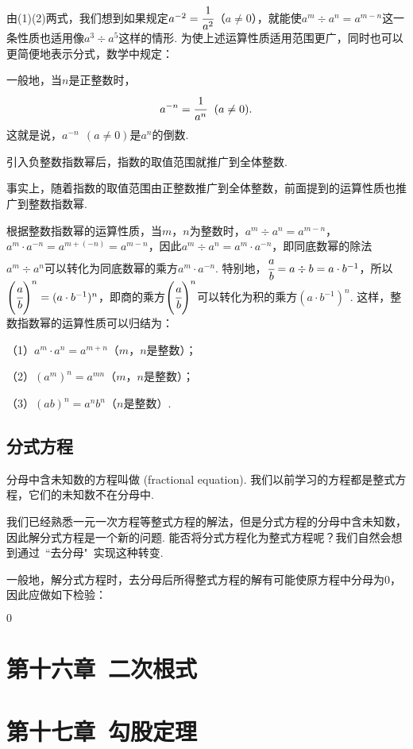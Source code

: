 \documentclass[UTF8,fontset=macnew]{book} %
\begin{document}
				由(1)(2)两式，我们想到如果规定$a^{-2}=\cfrac{1}{a^2} $（$a\ne 0$），就能使$a^m\div a^n=a^{m-n}$这一条性质也适用像$a^3\div a^5$这样的情形. 为使上述运算性质适用范围更广，同时也可以更简便地表示分式，数学中规定：
				
				一般地，当$n$是正整数时，
			$$a^{-n}=\cfrac{1}{a^n} \ \ (a\ne 0).$$
			这就是说，$a^{-n}\ \ (a\ne 0)$是$a^n$的倒数.
				
				引入负整数指数幂后，指数的取值范围就推广到全体整数.
				
				事实上，随着指数的取值范围由正整数推广到全体整数，前面提到的运算性质也推广到整数指数幂.
				
				根据整数指数幂的运算性质，当$m$，$n$为整数时，$a^m\div a^n=a^{m-n}$，$a^m\cdot a^{-n} =a^{m+(-n)}=a^{m-n}$，因此$a^m\div a^n=a^m\cdot a^{-n}$，即同底数幂的除法$a^m\div a^n$可以转化为同底数幂的乘方$a^m\cdot a^{-n}$. 特别地，$\cfrac{a}{b}=a\div b=a\cdot b^{-1}$，所以$\left( \cfrac{a}{b} \right) ^n=(a\cdot b^{-1})^n$，即商的乘方$\left( \cfrac{a}{b} \right)^n$可以转化为积的乘方$(a\cdot b^{-1})^n$. 这样，整数指数幂的运算性质可以归结为：
				
				（1）$a^m\cdot a^n=a^{m+n}$（$m$，$n$是整数）；
				
				（2）$(a^m)^n=a^{mn}$（$m$，$n$是整数）；
				
				（3）$(ab)^n=a^nb^n$（$n$是整数）.
		\section{分式方程}
			分母中含未知数的方程叫做\textcolor{hlblue}{} (fractional equation). 我们以前学习的方程都是整式方程，它们的未知数不在分母中.
			
			我们已经熟悉一元一次方程等整式方程的解法，但是分式方程的分母中含未知数，因此解分式方程是一个新的问题. 能否将分式方程化为整式方程呢？我们自然会想到通过\ “去分母"\ 实现这种转变.
			
			一般地，解分式方程时，去分母后所得整式方程的解有可能使原方程中分母为$0$，因此应做如下检验：
			
			\textcolor{hlblue}{ $0$ }
	\chapter{第十六章\ 二次根式}
	
	\chapter{第十七章\ 勾股定理}
	
\end{document}
